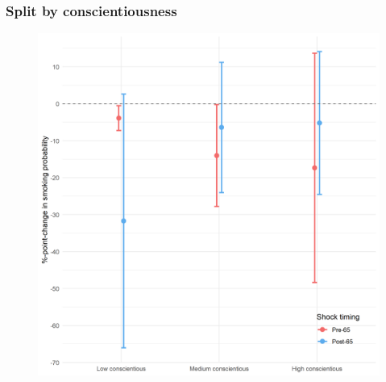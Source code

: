 \documentclass[10pt,compress,xcolor=dvipsnames]{beamer}    %
\newcounter{ex}
\newcommand{\1}[1]{\mathrm{1\hspace*{-2.5pt}l}[#1]}	%
\begin{document}
\begin{frame}
\frametitle{Split by conscientiousness}

\begin{figure}[hbtp]
\centering
\includegraphics[height=0.8\textheight]{../../3_output/shock_effects/consc_6070_100_cvplot.png}
\label{fig:consc}
\end{figure}
\hyperlink{frame:otherX}{}
\end{frame}
\end{document}
